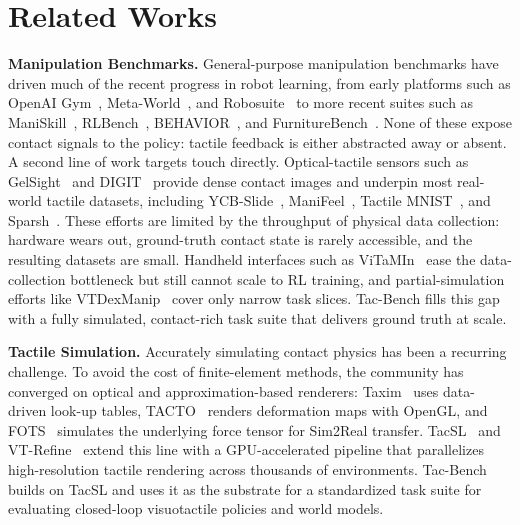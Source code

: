 \documentclass{article}
\begin{document}


\section{Related Works}

\textbf{Manipulation Benchmarks.}
General-purpose manipulation benchmarks have driven much of the recent progress in robot learning, from early platforms such as OpenAI Gym~\citep{brockman2016openai}, Meta-World~\citep{yu2020metaworld}, and Robosuite~\citep{zhu2020robosuite} to more recent suites such as ManiSkill~\citep{mu2021maniskill}, RLBench~\citep{james2020rlbench}, BEHAVIOR~\citep{srivastava2022behavior}, and FurnitureBench~\citep{heo2023furniturebench}. None of these expose contact signals to the policy: tactile feedback is either abstracted away or absent. A second line of work targets touch directly. Optical-tactile sensors such as GelSight~\citep{yuan2017gelsight} and DIGIT~\citep{lambeta2020digit} provide dense contact images and underpin most real-world tactile datasets, including YCB-Slide~\citep{suresh2022midastouch}, ManiFeel~\citep{xu2025manifeel}, Tactile MNIST~\citep{schneider2025tactilemnist}, and Sparsh~\citep{higuera2024sparsh}. These efforts are limited by the throughput of physical data collection: hardware wears out, ground-truth contact state is rarely accessible, and the resulting datasets are small. Handheld interfaces such as ViTaMIn~\citep{liu2025vitamin} ease the data-collection bottleneck but still cannot scale to RL training, and partial-simulation efforts like VTDexManip~\citep{liu2025vtdexmanip} cover only narrow task slices. Tac-Bench fills this gap with a fully simulated, contact-rich task suite that delivers ground truth at scale.

\textbf{Tactile Simulation.}
Accurately simulating contact physics has been a recurring challenge. To avoid the cost of finite-element methods, the community has converged on optical and approximation-based renderers: Taxim~\citep{si2022taxim} uses data-driven look-up tables, TACTO~\citep{wang2022tacto} renders deformation maps with OpenGL, and FOTS~\citep{zhao2024fots} simulates the underlying force tensor for Sim2Real transfer. TacSL~\citep{akinola2024tacsl} and VT-Refine~\citep{huang:corl2025} extend this line with a GPU-accelerated pipeline that parallelizes high-resolution tactile rendering across thousands of environments. Tac-Bench builds on TacSL and uses it as the substrate for a standardized task suite for evaluating closed-loop visuotactile policies and world models.
\end{document}
